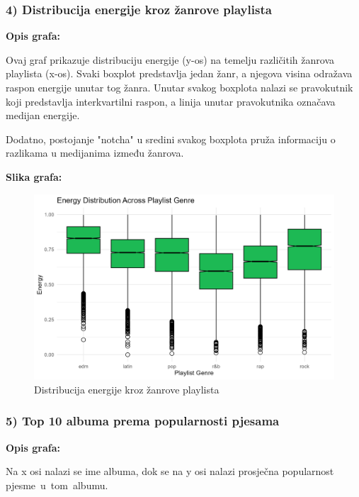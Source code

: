 		\subsubsection{4) Distribucija energije kroz žanrove playlista}
	
	\textbf{Opis grafa:}
	
	Ovaj graf prikazuje distribuciju energije (y-os) na temelju različitih žanrova playlista (x-os). Svaki boxplot predstavlja jedan žanr, a njegova visina odražava raspon energije unutar tog žanra. Unutar svakog boxplota nalazi se pravokutnik koji predstavlja interkvartilni raspon, a linija unutar pravokutnika označava medijan energije.
	
	Dodatno, postojanje "notcha" u sredini svakog boxplota pruža informaciju o razlikama u medijanima između žanrova.
	
		\textbf{Slika grafa:}
	\begin{figure}[H]
		\includegraphics[scale=0.9]{slike/Genre-Energy.png}
		\centering
		\caption{Distribucija energije kroz žanrove playlista}
		
	\end{figure}
	
	\subsubsection{5) Top 10 albuma prema popularnosti pjesama}
	
	\textbf{Opis grafa:}
	
	Na x osi nalazi se ime albuma, dok se na y osi nalazi prosječna popularnost pjesme u tom albumu. 
	
